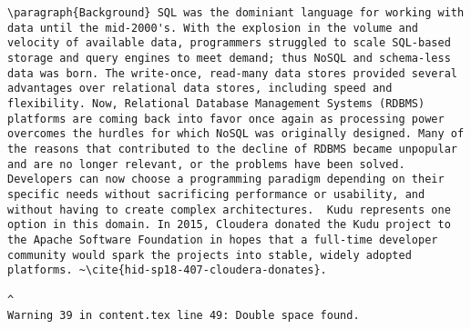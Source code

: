 \begin{tiny}
\begin{verbatim}
\paragraph{Background} SQL was the dominiant language for working with data until the mid-2000's. With the explosion in the volume and velocity of available data, programmers struggled to scale SQL-based storage and query engines to meet demand; thus NoSQL and schema-less data was born. The write-once, read-many data stores provided several advantages over relational data stores, including speed and flexibility. Now, Relational Database Management Systems (RDBMS) platforms are coming back into favor once again as processing power overcomes the hurdles for which NoSQL was originally designed. Many of the reasons that contributed to the decline of RDBMS became unpopular and are no longer relevant, or the problems have been solved. Developers can now choose a programming paradigm depending on their specific needs without sacrificing performance or usability, and without having to create complex architectures.  Kudu represents one option in this domain. In 2015, Cloudera donated the Kudu project to the Apache Software Foundation in hopes that a full-time developer community would spark the projects into stable, widely adopted platforms. ~\cite{hid-sp18-407-cloudera-donates}.  
                                                                                                                                                                                                                                                                                                                                                                                                                                                                                                                                                                                                                                                                                                                                                                                                                                                                                                                                                                                                                                                                                                                                                                                              ^
Warning 39 in content.tex line 49: Double space found.

\end{verbatim}
\end{tiny}
